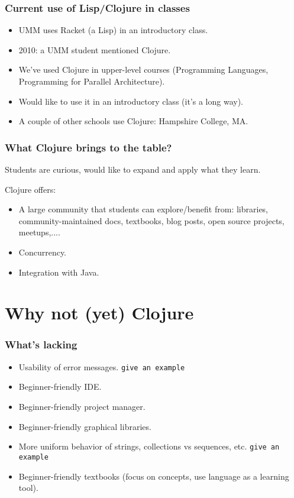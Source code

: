 \documentclass{beamer}
\begin{document}
\begin{frame}
   \frametitle{Current use of Lisp/Clojure in classes}
\begin{itemize}
\item UMM uses Racket (a Lisp) in an introductory class. 
\item 2010: a UMM student mentioned Clojure. 
\item We've used Clojure in upper-level courses (Programming Languages, Programming for Parallel Architecture).
\item Would like to use it in an introductory class (it's a long way).
\item A couple of other schools use Clojure: Hampshire College, MA. 
\end{itemize}
\end{frame}

\begin{frame}
   \frametitle{What Clojure brings to the table?}
Students are curious, would like to expand and apply what they learn. 

Clojure offers:
\begin{itemize}
\item A large community that students can explore/benefit from: libraries, community-maintained docs, textbooks, blog posts, open source projects, meetups,....
\item Concurrency.
\item Integration with Java. 
\end{itemize}
\end{frame}

\section{Why {\bf not} (yet) Clojure}

\begin{frame}
   \frametitle{What's lacking}
\begin{itemize}
\item Usability of error messages. {\tt give an example}
\item Beginner-friendly IDE. 
\item Beginner-friendly project manager. 
\item Beginner-friendly graphical libraries. 
\item More uniform behavior of strings, collections vs sequences, etc.   {\tt give an example}
\item Beginner-friendly textbooks (focus on concepts, use language as a learning tool). 
\end{itemize}
\end{frame}
\end{document}
